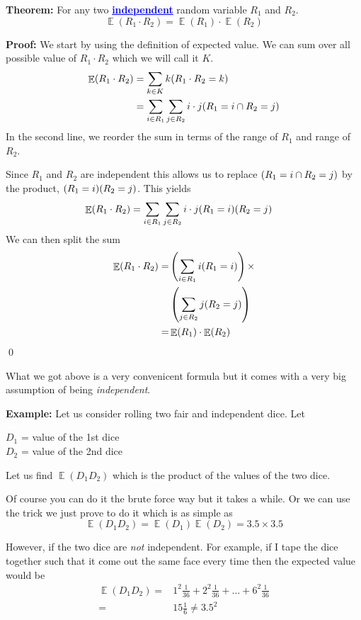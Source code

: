 \documentclass[a4paper, 12pt]{article}
\newcommand{\theorem}{\vspace{1em}\noindent\textbf{Theorem:} }
\newcommand{\example}{\vspace{1em}\noindent\textbf{Example:} }
\renewcommand{\proof}{\vspace{0.5em}\noindent\textbf{Proof:} }
\newcommand{\qedd}{\qed\newline}
\newcommand{\kwd}[1]{\textcolor{blue}{\textbf{\underline{#1}}}}
\let\Pr\relax
\DeclareMathOperator{\Pr}{Pr}
\DeclareMathOperator{\E}{\mathbb{E}}
\begin{document}
\begin{multicols}{2}
\theorem For any two \kwd{independent} random variable $R_1$ and $R_2$.
\[
	\E(R_1 \cdot R_2) = \E(R_1) \cdot \E(R_2)
\]

\proof We start by using the definition of expected value. We can sum over all possible value of $R_1 \cdot R_2$ which we will call it $K$.
\begin{align*}
	\E (R_1 \cdot R_2) &= \sum_{k \in K} k \Pr(R_1\cdot R_2 = k)\\
	&= \sum_{i\in R_1} \sum_{j \in R_2} i \cdot j \Pr(R_1 =i \cap R_2 = j)
\end{align*}
In the second line, we reorder the sum in terms of the range of $R_1$ and range of $R_2$.

Since $R_1$ and $R_2$ are independent this allows us to replace $\Pr(R_1 =i\cap R_2=j)$ by the product, $\Pr(R_1=i)\Pr(R_2=j)$. This yields
\begin{align*}
\E (R_1 \cdot R_2) &= \sum_{i\in R_1} \sum_{j \in R_2} i \cdot j \Pr(R_1=i)\Pr(R_2=j)
\end{align*}
We can then split the sum
\begin{align*}
\E (R_1 \cdot R_2) =& \left( \sum_{i\in R_1} i \Pr(R_1=i)\right) \times \\ &\left( \sum_{j \in R_2} j \Pr(R_2=j) \right)\\
=& \E(R_1) \cdot \E(R_2)
\end{align*}
\qedd

What we got above is a very convenicent formula but it comes with a very big assumption of being \emph{independent}.

\example Let us consider rolling two fair and independent dice. Let
\begin{center}
	$D_1$ = value of the 1st dice\\
	$D_2$ = value of the 2nd dice
\end{center}
Let us find $\E(D_1 D_2)$ which is the product of the values of the two dice.

Of course you can do it the brute force way but it takes a while. Or we can use the trick we just prove to do it which is as simple as
\[
	\E(D_1D_2) = \E(D_1)\E(D_2) = 3.5\times 3.5
\]

However, if the two dice are \emph{not} independent. For example, if I tape the dice together such that it come out the same face every time then the expected value would be
\begin{align*}
	\E(D_1 D_2) =& 1^2 \frac{1}{36} + 2^2 \frac{1}{36} + \ldots + 6^2 \frac{1}{36}\\
	=& 15 \frac{1}{6} \ne 3.5^2
\end{align*}


\end{multicols}
\end{document}
